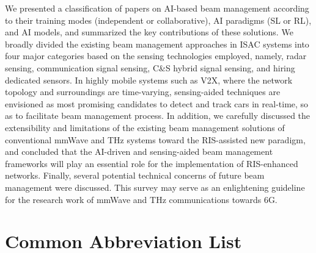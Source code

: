 \documentclass[journal,comsoc]{IEEEtran}
\begin{document}
We presented a classification of papers on AI-based beam management according to their training modes (independent or collaborative), AI paradigms (SL or RL), and AI models, and summarized the key contributions of these solutions. We broadly divided the existing beam management approaches in ISAC systems into four major categories based on the sensing technologies employed, namely, radar sensing, communication signal sensing, C\&S hybrid signal sensing, and hiring dedicated sensors. In highly mobile systems such as V2X, where the network topology and surroundings are time-varying, sensing-aided techniques are envisioned as most promising candidates to detect and track cars in real-time, so as to facilitate beam management process. In addition, we carefully discussed the extensibility and limitations of the existing beam management solutions of conventional mmWave and THz systems toward the RIS-assisted new paradigm, and concluded that the AI-driven and sensing-aided beam management frameworks will play an essential role for the implementation of RIS-enhanced networks. Finally, several potential technical concerns of future beam management were discussed. This survey may serve as an enlightening guideline for the research work of mmWave and THz communications towards 6G.



\section*{Common Abbreviation List}
\end{document}
